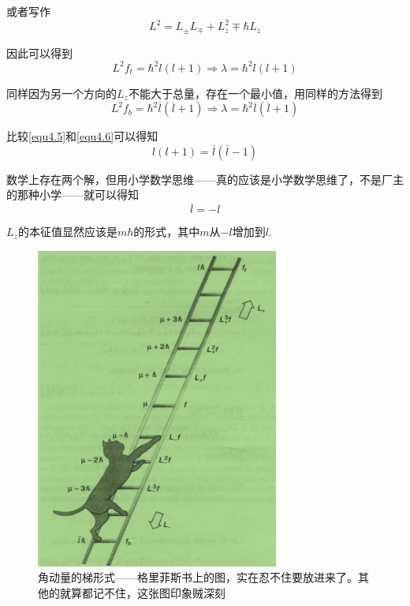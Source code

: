 \documentclass[UTF8]{ctexart}
\begin{document}
\noindent 或者写作
\begin{equation}
    L^2 = L_{\pm} L_{\mp} + L_z^2 \mp \hbar L_z \label{equ4.7}
\end{equation}

\noindent 因此可以得到
\begin{equation}
    L^2 f_t = \hbar^2l(l+1) \Rightarrow \lambda = \hbar^2l(l+1) \label{equ4.5}
\end{equation}

    同样因为另一个方向的$L_z$不能大于总量，存在一个最小值，用同样的方法得到
    \begin{equation}
        L^2 f_b = \hbar^2\overline{l}(\overline{l}+1) \Rightarrow \lambda = \hbar^2\overline{l}(\overline{l}+1) \label{equ4.6}
    \end{equation}

\noindent 比较\autoref{equ4.5}和\autoref{equ4.6}可以得知
\begin{equation}
    l(l+1) = \overline{l}(\overline{l} -1)
\end{equation}

\noindent 数学上存在两个解，但用小学数学思维——真的应该是小学数学思维了，不是厂主的那种小学——就可以得知
\begin{equation}
    \overline{l} = - l
\end{equation}

\noindent $L_z$的本征值显然应该是$m\hbar$的形式，其中$m$从$-l$增加到$l$.

\newpage
\begin{figure}[htb]
    \centering
    \includegraphics[width=8cm]{figure4-5.png}
    \caption{角动量的梯形式——格里菲斯书上的图，实在忍不住要放进来了。其他的就算都记不住，这张图印象贼深刻}
    \label{figure4.5}
\end{figure}
\end{document}
